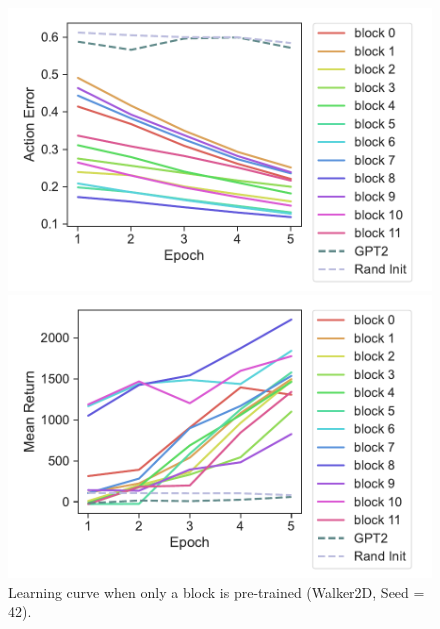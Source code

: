 \documentclass{article}
\begin{document}
\begin{figure}[H]
    \centering
    \begin{minipage}[b]{0.48\linewidth}
        \includegraphics[width=\linewidth]{figs/actionerror_block_gpt2_dt_K1_walker2d_medium_42.pdf}
    \end{minipage}
    \begin{minipage}[b]{0.48\linewidth}
        \includegraphics[width=\linewidth]{figs/returnmean_block_gpt2_dt_K1_walker2d_medium_42.pdf}
    \end{minipage}
    \caption{Learning curve when only a block is pre-trained (Walker2D, Seed = 42).}
    \label{fig:learning_curve_walker2d_42}
\end{figure}
\end{document}
